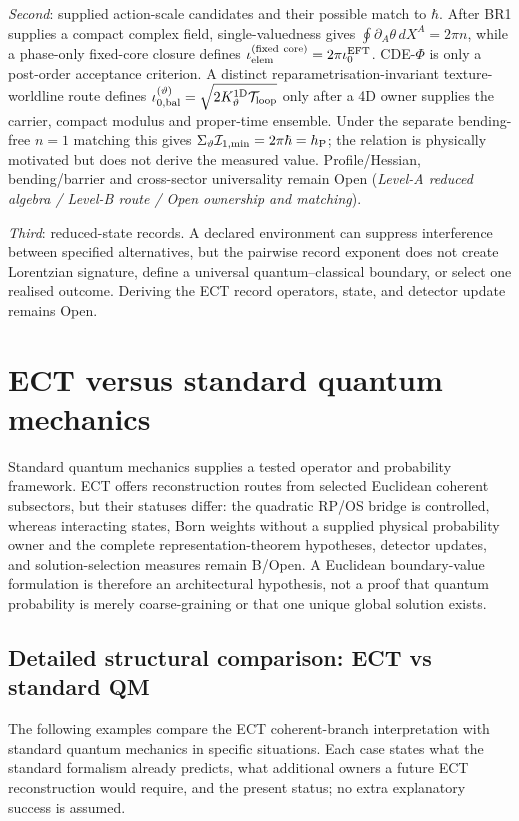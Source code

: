 \documentclass[11pt,a4paper]{article}
\begin{document}
\emph{Second}: supplied action-scale candidates and their possible match to $\hbar$. After BR1 supplies a compact complex field, single-valuedness gives $\oint \partial_A\theta\,dX^A = 2\pi n$, while a phase-only fixed-core closure defines $\iota_{\rm elem}^{\rm(fixed\ core)}=2\pi \iota_0^{\rm EFT}$.  CDE-$\Phi$ is only a post-order acceptance criterion.  A distinct reparametrisation-invariant texture-worldline route defines $\iota_{0,\rm bal}^{(\vartheta)}=\sqrt{2K_\vartheta^{1\mathrm D}\mathcal T_{\rm loop}}$ only after a 4D owner supplies the carrier, compact modulus and proper-time ensemble.  Under the separate bending-free $n=1$ matching this gives $\Sigma_\vartheta\mathcal I_{1,\min}=2\pi\hbar=h_{\rm P}$; the relation is physically motivated but does not derive the measured value.  Profile/Hessian, bending/barrier and cross-sector universality remain Open (\emph{Level-A reduced algebra / Level-B route / Open ownership and matching}).

\emph{Third}: reduced-state records.  A declared environment can suppress
interference between specified alternatives, but the pairwise record exponent
does not create Lorentzian signature, define a universal
quantum--classical boundary, or select one realised outcome.  Deriving the ECT
record operators, state, and detector update remains Open.

\section{ECT versus standard quantum mechanics}
\label{sec:pop_ect_vs_qm}

Standard quantum mechanics supplies a tested operator and probability
framework. ECT offers reconstruction routes from selected Euclidean coherent
subsectors, but their statuses differ: the quadratic RP/OS bridge is controlled,
whereas interacting states, Born weights without a supplied physical probability owner and the complete representation-theorem hypotheses, detector updates, and
solution-selection measures remain B/Open.  A Euclidean boundary-value
formulation is therefore an architectural hypothesis, not a proof that quantum
probability is merely coarse-graining or that one unique global solution exists.

\subsection{Detailed structural comparison: ECT vs standard QM}

The following examples compare the ECT coherent-branch interpretation with
standard quantum mechanics in specific situations.  Each case states what the
standard formalism already predicts, what additional owners a future ECT
reconstruction would require, and the present status; no extra explanatory
success is assumed.
\end{document}
